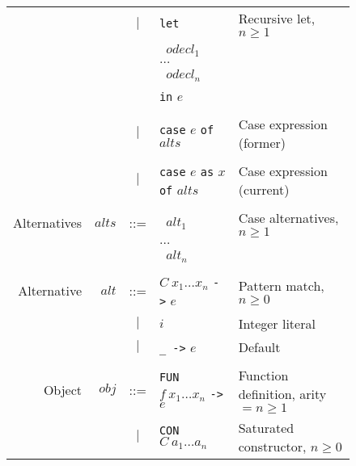 \documentclass[11pt]{article}
\begin{document}
\begin{figure}
\begin{tabular}{r r c l l}
             &                & $|$ & \texttt{let}                                 & Recursive let, $n\ge 1$ \\
             &                &     & \texttt{ } $\mathit{odecl}_1$ \\
             &                &     & \hspace{0.2in} $\dots$ \\
             &                &     & \texttt{ } $\mathit{odecl}_n$ \\
             &                &     & \texttt{in} $e$  \\
\\
             &                & $|$ & \texttt{case} $e$ \texttt{of} $\mathit{alts}$ & Case expression (former) \\
\\
             &                & $|$ & \texttt{case} $e$ \texttt{as} $x$ \texttt{of} $\mathit{alts}$ & Case expression (current) \\
\\
Alternatives & $\mathit{alts}$ & ::= & \texttt{ } $\mathit{alt}_1$                  & Case alternatives, $n \ge 1$\\
             &                &     & \hspace{0.2in} $\dots$ \\
             &                &     & \texttt{ } $\mathit{alt}_n$ \\
\\
Alternative  & $\mathit{alt}$ & ::= & $C\ x_1\dots x_n$ \texttt{->} $e$            & Pattern match, $n \ge 0$ \\
             &                & $|$ & $i$                                          & Integer literal \\
             &                & $|$ & \texttt{\_ ->} $e$                           & Default \\
\\
Object       & $\mathit{obj}$ & ::= &\texttt{FUN} $f\ x_1\dots x_n$ \texttt{->} $e$   & Function definition, arity $=n\ge 1$ \\
             &                & $|$ &\texttt{CON} $C\ a_1\dots a_n$                & Saturated constructor, $n \ge 0$ \\

\end{tabular}
\end{figure}
\end{document}

